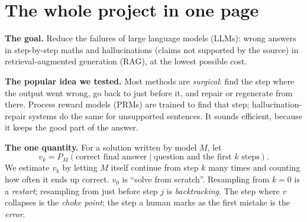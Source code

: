 \documentclass[11pt,a4paper]{article}
\begin{document}
\tableofcontents
\newpage

\section{The whole project in one page}\label{sec:onepage}

\textbf{The goal.} Reduce the failures of large language models (LLMs): wrong answers in
step-by-step maths and hallucinations (claims not supported by the source) in retrieval-augmented
generation (RAG), at the lowest possible cost.

\textbf{The popular idea we tested.} Most methods are \emph{surgical}: find the step where the output
went wrong, go back to just before it, and repair or regenerate from there. Process reward models
(PRMs) are trained to find that step; hallucination-repair systems do the same for unsupported
sentences. It sounds efficient, because it keeps the good part of the answer.

\textbf{The one quantity.} For a solution written by model $M$, let
\[ v_k = P_M(\text{correct final answer} \mid \text{question and the first } k \text{ steps}). \]
We estimate $v_k$ by letting $M$ itself continue from step $k$ many times and counting how often it
ends up correct. $v_0$ is ``solve from scratch''. Resampling from $k=0$ is a \emph{restart};
resampling from just before step $j$ is \emph{backtracking}. The step where $v$ collapses is the
\emph{choke point}; the step a human marks as the first mistake is the \emph{error}.
\end{document}
